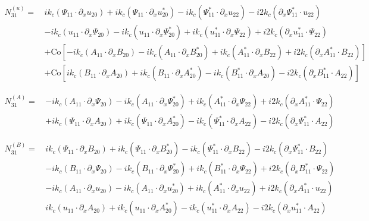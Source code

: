\documentclass[twocolumn]{aastex61}
\newcommand{\beq}{\begin{equation}}
\newcommand{\eeq}{\end{equation}}
\newcommand{\Co}{\mathrm{Co}}
\begin{document}
\beq
\begin{split}
N_{31}^{(u)} = \, & i k_c \left(\Psi_{11} \cdot \partial_x u_{20}\right) + i k_c \left(\Psi_{11} \cdot \partial_x u_{20}^*\right) - i k_c \left(\Psi_{11}^* \cdot \partial_x u_{22}\right) - i 2 k_c \left(\partial_x \Psi_{11}^* \cdot u_{22}\right) \\
& - i k_c \left(u_{11} \cdot \partial_x \Psi_{20} \right) - i k_c \left(u_{11} \cdot \partial_x \Psi_{20}^*\right) + i k_c \left(u_{11}^* \cdot \partial_x \Psi_{22} \right) + i 2 k_c \left(\partial_x u_{11}^* \cdot \Psi_{22}\right) \\
& +\Co \left[- i k_c \left(A_{11} \cdot \partial_x B_{20}\right) - i k_c \left(A_{11} \cdot \partial_x B_{20}^*\right) + i k_c \left(A_{11}^* \cdot \partial_x B_{22}\right) + i 2 k_c \left(\partial_x A_{11}^* \cdot B_{22}\right)\right] \\
& + \Co \left[ i k_c \left(B_{11} \cdot \partial_x A_{20}\right) + i k_c \left(B_{11} \cdot \partial_x A_{20}^*\right) - i k_c \left(B_{11}^* \cdot \partial_x A_{20}\right) - i 2 k_c \left(\partial_x B_{11}^* \cdot A_{22}\right)\right]
\end{split}
\eeq

\beq
\begin{split}
N_{31}^{(A)} =\, & -i k_c \left(A_{11}\cdot\partial_x \Psi_{20}\right) - i k_c \left(A_{11} \cdot \partial_x \Psi_{20}^*\right)
 + i k_c \left(A_{11}^* \cdot \partial_x \Psi_{22}\right) + i 2 k_c \left(\partial_x A_{11}^* \cdot \Psi_{22}\right) \\
 & + i k_c \left(\Psi_{11} \cdot \partial_x A_{20}\right) + i k_c \left(\Psi_{11} \cdot \partial_x A_{20}^*\right) - i k_c \left(\Psi_{11}^* \cdot \partial_x A_{22} \right) - i 2 k_c \left(\partial_x \Psi_{11}^* \cdot A_{22}\right)
\end{split}
\eeq

\beq
\begin{split}
N_{31}^{(B)} = \, & i k_c \left(\Psi_{11} \cdot \partial_x B_{20}\right) + i k_c \left(\Psi_{11} \cdot \partial_x B_{20}^*\right) - i k_c \left(\Psi_{11}^* \cdot \partial_x B_{22}\right) - i 2 k_c\left(\partial_x \Psi_{11}^* \cdot B_{22}\right) \\
& - i k_c \left(B_{11} \cdot \partial_x \Psi_{20}\right) - i k_c \left(B_{11} \cdot \partial_x \Psi_{20}^*\right) + i k_c\left(B_{11}^* \cdot \partial_x \Psi_{22}\right) + i 2 k_c \left(\partial_x B_{11}^* \cdot \Psi_{22}\right) \\
& - i k_c \left(A_{11} \cdot \partial_x u_{20}\right) - i k_c \left(A_{11} \cdot \partial_x u_{20}^*\right) + i k_c \left(A_{11}^* \cdot \partial_x u_{22}\right) + i 2 k_c \left(\partial_x A_{11}^* \cdot u_{22}\right) \\
& i k_c \left(u_{11} \cdot \partial_x A_{20} \right) + i k_c \left(u_{11} \cdot \partial_x A_{20}^*\right) - i k_c \left(u_{11}^* \cdot \partial_x A_{22}\right) - i 2 k_c \left(\partial_x u_{11}^* \cdot A_{22}\right)
\end{split}
\eeq
\end{document}
